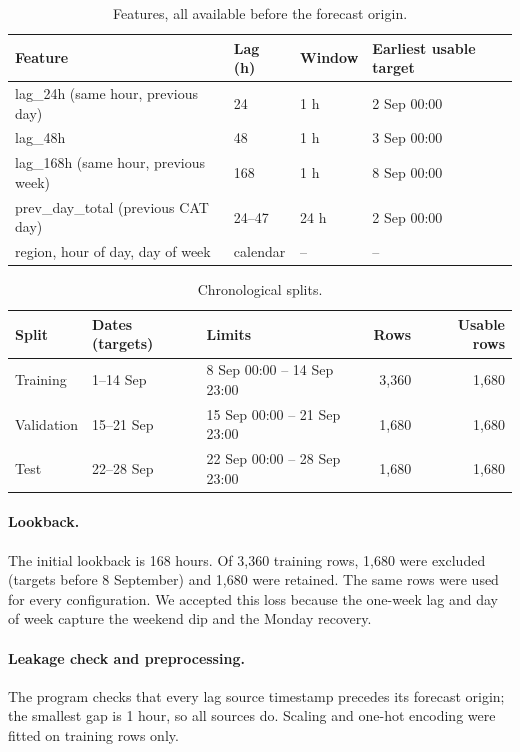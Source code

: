 \documentclass[11pt,a4paper]{article}
\begin{document}
\begin{table}[H]\centering\small
\begin{tabular}{llll}\toprule
Feature & Lag (h) & Window & Earliest usable target\\\midrule
lag\_24h (same hour, previous day) & 24 & 1 h & 2 Sep 00:00\\
lag\_48h & 48 & 1 h & 3 Sep 00:00\\
lag\_168h (same hour, previous week) & 168 & 1 h & 8 Sep 00:00\\
prev\_day\_total (previous CAT day) & 24--47 & 24 h & 2 Sep 00:00\\
region, hour of day, day of week & calendar & -- & --\\\bottomrule
\end{tabular}
\caption{Features, all available before the forecast origin.}
\end{table}

\begin{table}[H]\centering\small
\begin{tabular}{lllrr}\toprule
Split & Dates (targets) & Limits & Rows & Usable rows\\\midrule
Training & 1--14 Sep & 8 Sep 00:00 -- 14 Sep 23:00 & 3,360 & 1,680\\
Validation & 15--21 Sep & 15 Sep 00:00 -- 21 Sep 23:00 & 1,680 & 1,680\\
Test & 22--28 Sep & 22 Sep 00:00 -- 28 Sep 23:00 & 1,680 & 1,680\\\bottomrule
\end{tabular}
\caption{Chronological splits.}
\end{table}

\paragraph{Lookback.}
The initial lookback is 168 hours. Of 3,360 training rows, 1,680 were excluded (targets
before 8 September) and 1,680 were retained. The same rows were used for every
configuration. We accepted this loss because the one-week lag and day of week capture
the weekend dip and the Monday recovery.

\paragraph{Leakage check and preprocessing.}
The program checks that every lag source timestamp precedes its forecast origin; the
smallest gap is 1 hour, so all sources do. Scaling and one-hot encoding were fitted on
training rows only.
\end{document}
